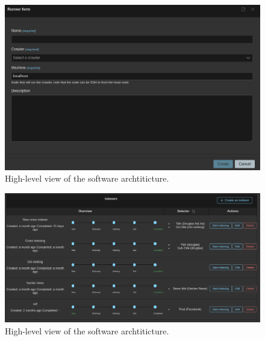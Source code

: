 \begin{figure}[h]	
     \centering
     \includegraphics[width=13cm]{images/demo-9.png}
     \caption{High-level view of the software archtiticture.}
     \label{fig:software-arch}
\end{figure}

\begin{figure}[h]	
     \centering
     \includegraphics[width=13cm]{images/demo-10.png}
     \caption{High-level view of the software archtiticture.}
     \label{fig:software-arch}
\end{figure}

